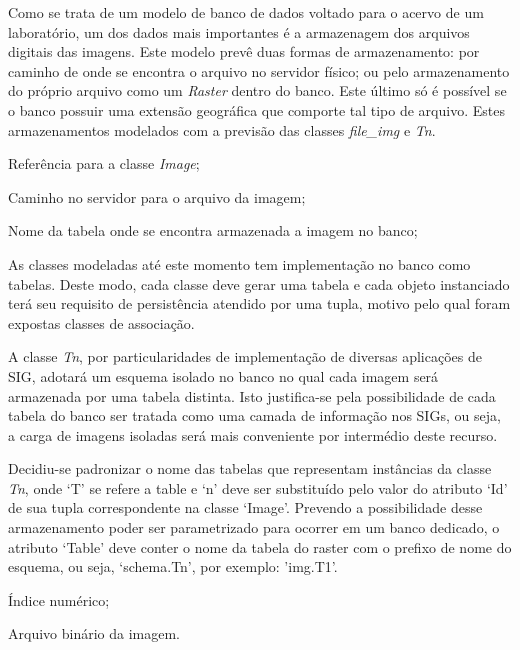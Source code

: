 Como se trata de um modelo de banco de dados voltado para o acervo de um laboratório, um dos dados mais importantes é a armazenagem dos arquivos digitais das imagens. Este modelo prevê duas formas de armazenamento: por caminho de onde se encontra o arquivo no servidor físico; ou pelo armazenamento do próprio arquivo como um \textit{Raster} dentro do banco. Este último só é possível se o banco possuir uma extensão geográfica que comporte tal tipo de arquivo. Estes armazenamentos modelados com a previsão das classes \textit{file\_img} e \textit{Tn}. 

\begin{description}[labelwidth=2cm, itemsep=-0.3cm]
\item [Classe File\_img]
\item[Id\_img:]  Referência para a classe \textit{Image};
\item[File\_path:] Caminho no servidor para o arquivo da imagem;
\item[Table:] Nome da tabela onde se encontra armazenada a imagem no banco;
\end{description}

As classes modeladas até este momento tem implementação no banco como tabelas. Deste modo, cada classe deve gerar uma tabela e cada objeto instanciado terá seu requisito de persistência atendido por uma tupla, motivo pelo qual foram expostas classes de associação.

A classe \textit{Tn}, por particularidades de implementação de diversas aplicações de SIG, adotará um esquema isolado no banco no qual cada imagem será armazenada por uma tabela distinta. Isto justifica-se pela possibilidade de cada tabela do banco ser tratada como uma camada de informação nos SIGs, ou seja, a carga de imagens isoladas será mais conveniente por intermédio deste recurso.

Decidiu-se padronizar o nome das tabelas que representam instâncias da classe \textit{Tn}, onde `T' se refere a table e `n' deve ser substituído pelo valor do atributo `Id' de sua tupla correspondente na classe `Image'. Prevendo a possibilidade desse armazenamento poder ser parametrizado para ocorrer em um banco dedicado, o atributo `Table' deve conter o nome da tabela do raster com o prefixo de nome do esquema, ou seja, `schema.Tn', por exemplo: 'img.T1'.

\begin{description}[labelwidth=2cm, itemsep=-0.3cm]
\item [Classe Tn]
\item[rid:] Índice numérico;
\item[rast:] Arquivo binário da imagem.
\end{description}

